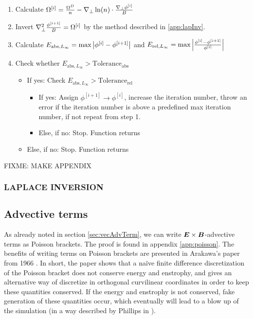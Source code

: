 \begin{algorithm}
\begin{enumerate}
    \item Calculate
        $ \Omega^{[i]} = \frac{\Omega^D}{n} -
        \nabla_\perp \ln(n) \cdot\frac{\nabla_\perp\phi^{[i]}}{B}
        $
    \item Invert $\nabla_\perp^2 \frac{\phi^{[i+1]}}{B} = \Omega^{[i]}$ by the method
        described in \ref{app:lapInv}.
    \item Calculate
        $E_{\text{abs}, L_\infty} = \text{max} \left|\phi^{[i]} - \phi^{[i+1]}\right|$
        and
        $E_{\text{rel}, L_\infty} = \text{max} \left|\frac{\phi^{[i]} - \phi^{[i+1]}}{\phi^{[i]}}\right|$
    \item Check whether $E_{\text{abs}, L_\infty} > \text{Tolerance}_\text{abs}$
    \begin{itemize}[noitemsep,nolistsep]
        \item If yes: Check $E_{\text{abs}, L_\infty} > \text{Tolerance}_\text{rel}$
            \begin{itemize}[noitemsep,nolistsep]
                \item If yes: Assign $\phi^{[i+1]} \to \phi^{[i]}$, increase the
                    iteration number, throw an error if the iteration number is
                    above a predefined max iteration number, if not repeat from
                    step 1.
                \item Else, if no: Stop. Function returns
            \end{itemize}
        \item Else, if no: Stop. Function returns
    \end{itemize}
\end{enumerate}
\end{algorithm}
%


FIXME: MAKE APPENDIX
\subsubsection{LAPLACE INVERSION}


\subsection{Advective terms}
\label{sec:ExBadv}
As already noted in section \ref{sec:vecAdvTerm}, we can write
$\boldsymbol{E}\times\boldsymbol{B}$-advective terms as Poisson brackets. The proof is found in
appendix \ref{app:poisson}. The benefits of writing terms on Poisson brackets
are presented in Arakawa's paper from 1966 \cite{Arakwa1966}. In short, the
paper shows that a na\"ive finite difference discretization of the Poisson
bracket does not conserve energy and enstrophy, and gives an alternative
way of discretize in orthogonal curvilinear coordinates in order to keep these
quantities conserved. If the energy and enstrophy is not conserved, fake
generation of these quantities occur, which eventually will lead to a blow up
of the simulation (in a way described by Phillips in \cite{Phillips1959}).

